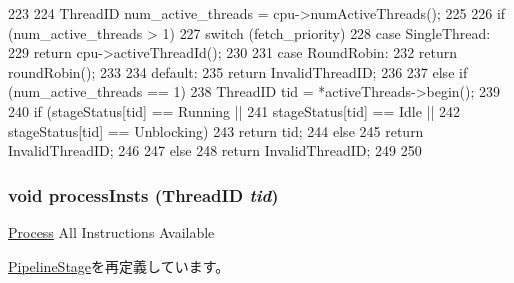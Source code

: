 \begin{DoxyCode}
223 {
224     ThreadID num_active_threads = cpu->numActiveThreads();
225 
226     if (num_active_threads > 1) {
227         switch (fetch_priority) {
228           case SingleThread:
229             return cpu->activeThreadId();
230 
231           case RoundRobin:
232             return roundRobin();
233 
234           default:
235             return InvalidThreadID;
236         }
237     } else if (num_active_threads == 1) {
238         ThreadID tid = *activeThreads->begin();
239 
240         if (stageStatus[tid] == Running ||
241             stageStatus[tid] == Idle ||
242             stageStatus[tid] == Unblocking) {
243             return tid;
244         } else {
245             return InvalidThreadID;
246         }
247     } else {
248         return InvalidThreadID;
249     }    
250 }
\end{DoxyCode}
\hypertarget{classFirstStage_a4120d7c6b83eb82877f4d21109c105ba}{
\subsubsection[{processInsts}]{\setlength{\rightskip}{0pt plus 5cm}void processInsts ({\bf ThreadID} {\em tid})}}
\label{classFirstStage_a4120d7c6b83eb82877f4d21109c105ba}
\hyperlink{classProcess}{Process} All Instructions Available 

\hyperlink{classPipelineStage_a4120d7c6b83eb82877f4d21109c105ba}{PipelineStage}を再定義しています。


